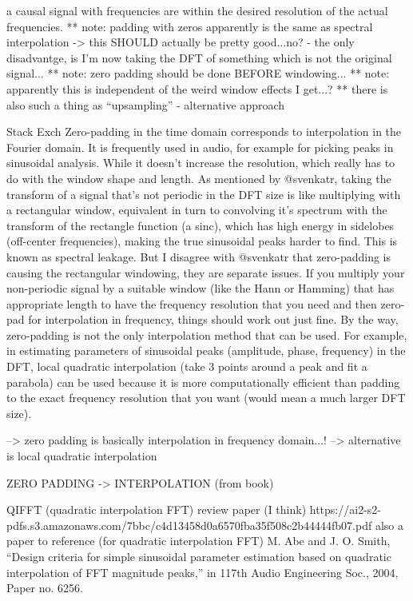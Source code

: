 a causal signal with frequencies are within the desired resolution of the actual
frequencies. ** note: padding with zeros apparently is the same as spectral
interpolation -> this SHOULD actually be pretty good...no? - the only
disadvantge, is I'm now taking the DFT of something which is not the original
signal... ** note: zero padding should be done BEFORE windowing... ** note:
apparently this is independent of the weird window effects I get...? ** there is
also such a thing as ``upsampling'' - alternative approach

Stack Exch Zero-padding in the time domain corresponds to interpolation in the
Fourier domain. It is frequently used in audio, for example for picking peaks in
sinusoidal analysis. While it doesn't increase the resolution, which really has
to do with the window shape and length. As mentioned by @svenkatr, taking the
transform of a signal that's not periodic in the DFT size is like multiplying
with a rectangular window, equivalent in turn to convolving it's spectrum with
the transform of the rectangle function (a sinc), which has high energy in
sidelobes (off-center frequencies), making the true sinusoidal peaks harder to
find. This is known as spectral leakage. But I disagree with @svenkatr that
zero-padding is causing the rectangular windowing, they are separate issues. If
you multiply your non-periodic signal by a suitable window (like the Hann or
Hamming) that has appropriate length to have the frequency resolution that you
need and then zero-pad for interpolation in frequency, things should work out
just fine. By the way, zero-padding is not the only interpolation method that
can be used. For example, in estimating parameters of sinusoidal peaks
(amplitude, phase, frequency) in the DFT, local quadratic interpolation (take 3
points around a peak and fit a parabola) can be used because it is more
computationally efficient than padding to the exact frequency resolution that
you want (would mean a much larger DFT size).

--> zero padding is basically interpolation in frequency domain...! -->
alternative is local quadratic interpolation

ZERO PADDING -> INTERPOLATION (from book)

QIFFT (quadratic interpolation FFT)
review paper (I think) https://ai2-s2-pdfs.s3.amazonaws.com/7bbc/c4d13458d0a6570fba35f508c2b44444fb07.pdf
also a paper to reference (for quadratic interpolation FFT)
 M. Abe and J. O. Smith, “Design criteria for simple sinusoidal parameter
estimation based on quadratic interpolation of FFT magnitude
peaks,” in 117th Audio Engineering Soc., 2004, Paper no. 6256.



